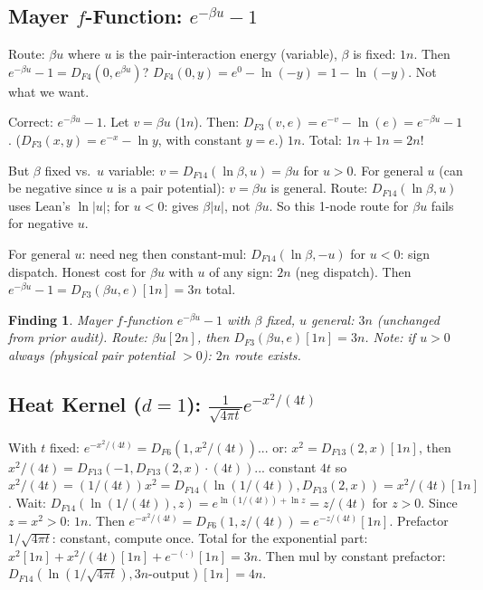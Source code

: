 \documentclass[11pt]{article}
\newtheorem{finding}[theorem]{Finding}
\newcommand{\ok}[1]{\textcolor{ok}{#1}}
\begin{document}
\subsection{Mayer $f$-Function: $e^{-\beta u}-1$}

Route: $\beta u$ where $u$ is the pair-interaction energy (variable), $\beta$ is fixed: $1n$.
Then $e^{-\beta u} - 1 = D_{F4}(0, e^{\beta u})$?
$D_{F4}(0, y) = e^0 - \ln(-y) = 1 - \ln(-y)$. Not what we want.

Correct: $e^{-\beta u} - 1$. Let $v = \beta u$ ($1n$). Then:
$D_{F3}(v, e) = e^{-v} - \ln(e) = e^{-\beta u} - 1$. ($D_{F3}(x,y) = e^{-x} - \ln y$, with constant $y=e$.) $1n$.
Total: $1n + 1n = 2n$!

But $\beta$ fixed vs.\ $u$ variable: $v = D_{F14}(\ln\beta, u) = \beta u$ for $u > 0$.
For general $u$ (can be negative since $u$ is a pair potential): $v = \beta u$ is general.
Route: $D_{F14}(\ln\beta, u)$ uses Lean's $\ln|u|$; for $u < 0$: gives $\beta|u|$, not $\beta u$.
So this 1-node route for $\beta u$ fails for negative $u$.

For general $u$: need neg then constant-mul: $D_{F14}(\ln\beta, -u)$ for $u < 0$: sign dispatch.
Honest cost for $\beta u$ with $u$ of any sign: $2n$ (neg dispatch).
Then $e^{-\beta u} - 1 = D_{F3}(\beta u, e)[1n] = 3n$ total.

\begin{finding}
Mayer $f$-function $e^{-\beta u}-1$ with $\beta$ fixed, $u$ general: \ok{$3n$ (unchanged from prior audit)}.
Route: $\beta u[2n]$, then $D_{F3}(\beta u, e)[1n] = 3n$.
Note: if $u > 0$ always (physical pair potential $>0$): $2n$ route exists.
\end{finding}

\subsection{Heat Kernel ($d=1$): $\frac{1}{\sqrt{4\pi t}} e^{-x^2/(4t)}$}

With $t$ fixed: $e^{-x^2/(4t)} = D_{F6}(1, x^2/(4t))$... or:
$x^2 = D_{F13}(2,x)[1n]$, then $x^2/(4t) = D_{F13}(-1, D_{F13}(2,x) \cdot (4t))$... constant $4t$ so $x^2/(4t) = (1/(4t)) x^2 = D_{F14}(\ln(1/(4t)), D_{F13}(2,x)) = x^2/(4t)[1n]$. Wait: $D_{F14}(\ln(1/(4t)), z) = e^{\ln(1/(4t)) + \ln z} = z/(4t)$ for $z > 0$. Since $z = x^2 > 0$: $1n$.
Then $e^{-x^2/(4t)} = D_{F6}(1, z/(4t)) = e^{-z/(4t)}[1n]$.
Prefactor $1/\sqrt{4\pi t}$: constant, compute once.
Total for the exponential part: $x^2[1n] + x^2/(4t)[1n] + e^{-(\cdot)}[1n] = 3n$.
Then mul by constant prefactor: $D_{F14}(\ln(1/\sqrt{4\pi t}), 3n\text{-output})[1n] = 4n$.
\end{document}
